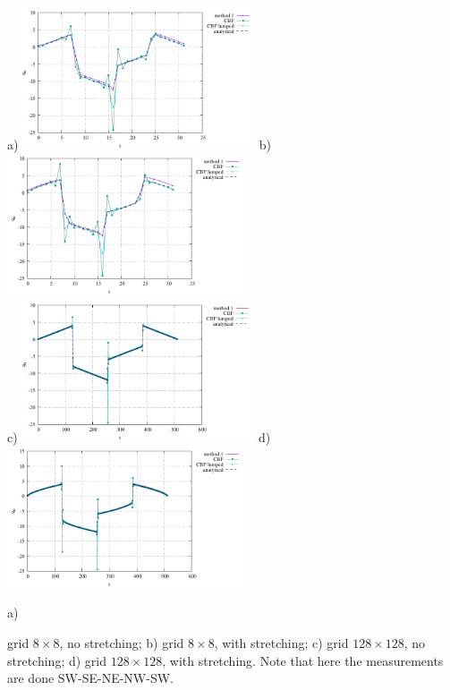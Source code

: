 \begin{center}
a)\includegraphics[width=7cm]{python_codes/fieldstone_173/results/CBF1/heat_flux_boundary.pdf}
b)\includegraphics[width=7cm]{python_codes/fieldstone_173/results/CBF2/heat_flux_boundary.pdf}\\
c)\includegraphics[width=7cm]{python_codes/fieldstone_173/results/CBF3/heat_flux_boundary.pdf}
d)\includegraphics[width=7cm]{python_codes/fieldstone_173/results/CBF4/heat_flux_boundary.pdf}\\
{\captionfont a) \item grid $8\times 8$, no stretching; b) grid $8\times 8$, with stretching;
c) grid $128\times 128$, no stretching; d) grid $128\times 128$, with stretching. 
Note that here the measurements are done SW-SE-NE-NW-SW.}
\end{center}

